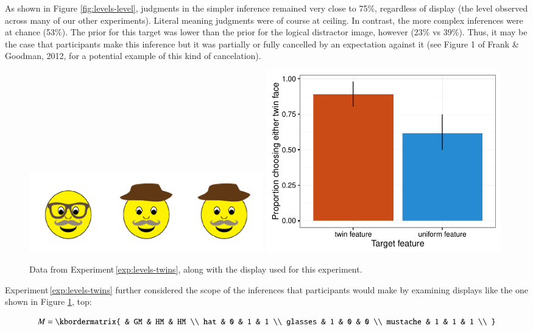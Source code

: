 \documentclass[man,noapacite]{apa2}
\newcounter{Experiment}
\newcommand{\exptref}[1]{Experiment\,\ref{#1}}
\begin{document}
As shown in Figure \ref{fig:levels-level}, judgments in the simpler inference remained very close to 75\%, regardless of display (the level observed across many of our other experiments). Literal meaning judgments were of course at ceiling. In contrast, the more complex inferences were at chance (53\%). The prior for this target was lower than the prior for the logical distractor image, however (23\% vs 39\%). Thus, it may be the case that participants make this inference but it was partially or fully cancelled  by an expectation against it (see Figure 1 of Frank \& Goodman, 2012, for a potential example of this kind of cancelation).

 \begin{figure}[t]
  \centering
  \includegraphics[width=4in]{figures/levels-twins-stim.pdf}
  \includegraphics[width=4in]{../plots/3-levels-twins.pdf}
  \caption{\label{fig:levels-twins} Data from \exptref{exp:levels-twins}, along with the display used for this experiment.}
\end{figure}

\exptref{exp:levels-twins} further considered the scope of the inferences that participants would make by examining displays like the one shown in Figure \ref{fig:levels-twins}, top:

\begin{equation}
    M = \kbordermatrix{
               & GM & HM & HM \\
      hat      & 0  & 1  & 1  \\
      glasses  & 1  & 0  & 0 \\
      mustache & 1  & 1  & 1 \\
    }
\end{equation}
\end{document}
